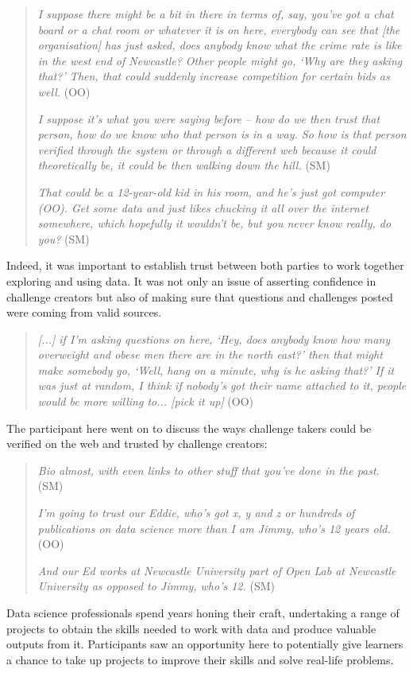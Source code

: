 \begin{quote}
    \textit{I suppose there might be a bit in there in terms of, say, you've got a chat board or a chat room or whatever it is on here, everybody can see that [the organisation] has just asked, does anybody know what the crime rate is like in the west end of Newcastle? Other people might go, `Why are they asking that?' Then, that could suddenly increase competition for certain bids as well.} (OO)
    
    \textit{I suppose it's what you were saying before -- how do we then trust that person, how do we know who that person is in a way. So how is that person verified through the system or through a different web because it could theoretically be, it could be then walking down the hill.} (SM)
    
    \textit{That could be a 12-year-old kid in his room, and he's just got computer (OO). Get some data and just likes chucking it all over the internet somewhere, which hopefully it wouldn't be, but you never know really, do you?} (SM)
\end{quote}
Indeed, it was important to establish trust between both parties to work together exploring and using data. It was not only an issue of asserting confidence in challenge creators but also of making sure that questions and challenges posted were coming from valid sources.
\begin{quote}
    \textit{[...] if I'm asking questions on here, `Hey, does anybody know how many overweight and obese men there are in the north east?' then that might make somebody go, `Well, hang on a minute, why is he asking that?' If it was just at random, I think if nobody's got their name attached to it, people would be more willing to... [pick it up]} (OO)
\end{quote}
The participant here went on to discuss the ways challenge takers could be verified on the web and trusted by challenge creators:
\begin{quote}
    \textit{Bio almost, with even links to other stuff that you've done in the past.} (SM)
    
    \textit{I'm going to trust our Eddie, who's got x, y and z or hundreds of publications on data science more than I am Jimmy, who's 12 years old.} (OO)
    
    \textit{And our Ed works at Newcastle University part of Open Lab at Newcastle University as opposed to Jimmy, who's 12.} (SM)
\end{quote}
Data science professionals spend years honing their craft, undertaking a range of projects to obtain the skills needed to work with data and produce valuable outputs from it. Participants saw an opportunity here to potentially give learners a chance to take up projects to improve their skills and solve real-life problems.
